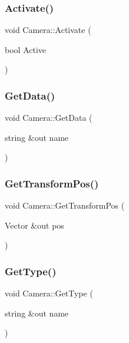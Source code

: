 \subsubsection{\texorpdfstring{Activate()}{Activate()}}
{\footnotesize\ttfamily void Camera\+::\+Activate (\begin{DoxyParamCaption}\item[{bool}]{Active }\end{DoxyParamCaption})}

\hypertarget{class_camera_a864de2841f5ba7e6fb839617c488b3e8}{}\label{class_camera_a864de2841f5ba7e6fb839617c488b3e8} 
\subsubsection{\texorpdfstring{Get\+Data()}{GetData()}}
{\footnotesize\ttfamily void Camera\+::\+Get\+Data (\begin{DoxyParamCaption}\item[{string \&out}]{name }\end{DoxyParamCaption})}

\hypertarget{class_camera_a71a1dcac29eec2c4b4ca9aab05604b56}{}\label{class_camera_a71a1dcac29eec2c4b4ca9aab05604b56} 
\subsubsection{\texorpdfstring{Get\+Transform\+Pos()}{GetTransformPos()}}
{\footnotesize\ttfamily void Camera\+::\+Get\+Transform\+Pos (\begin{DoxyParamCaption}\item[{Vector \&out}]{pos }\end{DoxyParamCaption})}

\hypertarget{class_camera_ae3cefb085319c07348cc2c5c39a675c1}{}\label{class_camera_ae3cefb085319c07348cc2c5c39a675c1} 
\subsubsection{\texorpdfstring{Get\+Type()}{GetType()}}
{\footnotesize\ttfamily void Camera\+::\+Get\+Type (\begin{DoxyParamCaption}\item[{string \&out}]{name }\end{DoxyParamCaption})}

